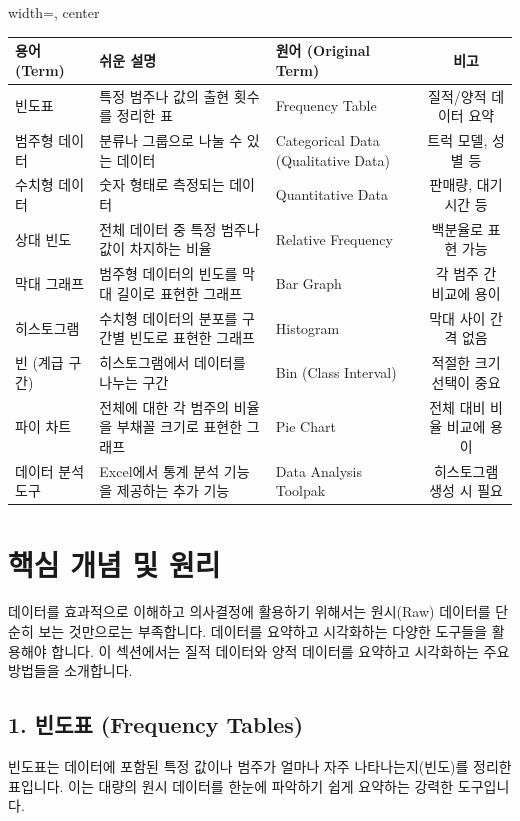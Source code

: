 \documentclass[11pt,a4paper]{article}
\theoremstyle{definition}
\begin{document}
\begin{adjustbox}{width=\textwidth, center}
\begin{tabular}{lllc}
\toprule
\textbf{용어 (Term)} & \textbf{쉬운 설명} & \textbf{원어 (Original Term)} & \textbf{비고} \\
\midrule
빈도표 & 특정 범주나 값의 출현 횟수를 정리한 표 & Frequency Table & 질적/양적 데이터 요약 \\
범주형 데이터 & 분류나 그룹으로 나눌 수 있는 데이터 & Categorical Data (Qualitative Data) & 트럭 모델, 성별 등 \\
수치형 데이터 & 숫자 형태로 측정되는 데이터 & Quantitative Data & 판매량, 대기 시간 등 \\
상대 빈도 & 전체 데이터 중 특정 범주나 값이 차지하는 비율 & Relative Frequency & 백분율로 표현 가능 \\
막대 그래프 & 범주형 데이터의 빈도를 막대 길이로 표현한 그래프 & Bar Graph & 각 범주 간 비교에 용이 \\
히스토그램 & 수치형 데이터의 분포를 구간별 빈도로 표현한 그래프 & Histogram & 막대 사이 간격 없음 \\
빈 (계급 구간) & 히스토그램에서 데이터를 나누는 구간 & Bin (Class Interval) & 적절한 크기 선택이 중요 \\
파이 차트 & 전체에 대한 각 범주의 비율을 부채꼴 크기로 표현한 그래프 & Pie Chart & 전체 대비 비율 비교에 용이 \\
데이터 분석 도구 & Excel에서 통계 분석 기능을 제공하는 추가 기능 & Data Analysis Toolpak & 히스토그램 생성 시 필요 \\
\bottomrule
\end{tabular}
\end{adjustbox}

\newpage
\section{핵심 개념 및 원리}

데이터를 효과적으로 이해하고 의사결정에 활용하기 위해서는 원시(Raw) 데이터를 단순히 보는 것만으로는 부족합니다. 데이터를 요약하고 시각화하는 다양한 도구들을 활용해야 합니다. 이 섹션에서는 질적 데이터와 양적 데이터를 요약하고 시각화하는 주요 방법들을 소개합니다.

\subsection{1. 빈도표 (Frequency Tables)}
빈도표는 데이터에 포함된 특정 값이나 범주가 얼마나 자주 나타나는지(빈도)를 정리한 표입니다. 이는 대량의 원시 데이터를 한눈에 파악하기 쉽게 요약하는 강력한 도구입니다.
\end{document}
